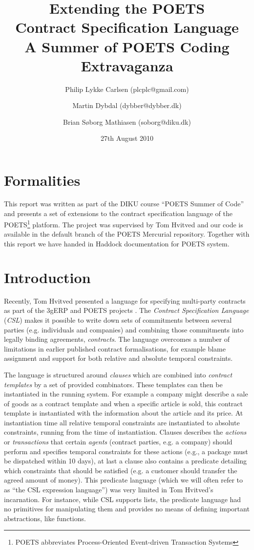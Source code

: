 \documentclass[10pt,a4paper,final,oneside,openany,article]{memoir}
\title{Extending the POETS \\ Contract Specification Language\\
       \vspace{0.1cm}
        \small{A Summer of POETS Coding Extravaganza}}
\author{Philip Lykke Carlsen (plcplc@gmail.com) \and
        Martin Dybdal (dybber@dybber.dk) \and
        Brian Søborg Mathiasen (soborg@diku.dk)}
\date{27th August 2010}
\begin{document}


\maketitle

\chapter{Formalities}
This report was written as part of the DIKU course ``POETS Summer of
Code'' and presents a set of extensions to the contract specification
language of the POETS\footnote{POETS abbreviates Process-Oriented
  Event-driven Transaction Systems} platform. The project was
supervised by Tom Hvitved and our code is available in the default
branch of the POETS Mercurial repository. Together with this report we
have handed in Haddock documentation for POETS system.

\chapter{Introduction}
Recently, Tom Hvitved presented a language for specifying multi-party
contracts \cite{hvitved10} as part of the 3gERP and POETS projects
\cite{3gerp}. The \textit{Contract Specification Language}
(\textit{CSL}) makes it possible to write down sets of commitments
between several parties (e.g. individuals and companies) and combining
those commitments into legally binding agreements,
\textit{contracts}. The language overcomes a number of limitations in
earlier published contract formalisations, for example blame assignment and
support for both relative and absolute temporal constraints.

The language is structured around \textit{clauses} which are combined
into \textit{contract templates} by a set of provided
combinators. These templates can then be instantiated in the running
system. For example a company might describe a sale of goods as a
contract template and when a specific article is sold, this contract
template is instantiated with the information about the article and
its price. At instantiation time all relative temporal constraints are
instantiated to absolute constraints, running from the time of
instantiation. Clauses describes the \textit{actions} or
\textit{transactions} that certain \textit{agents} (contract parties,
e.g. a company) should perform and specifies temporal constraints for
these actions (e.g., a package must be dispatched within 10 days), at
last a clause also contains a predicate detailing which constraints
that should be satisfied (e.g. a customer should transfer the agreed
amount of money). This predicate language (which we will often refer
to as ``the CSL expression language'') was very limited in Tom
Hvitved's incarnation. For instance, while CSL supports lists, the
predicate language had no primitives for manipulating them and
provides no means of defining important abstractions, like functions.
\end{document}
